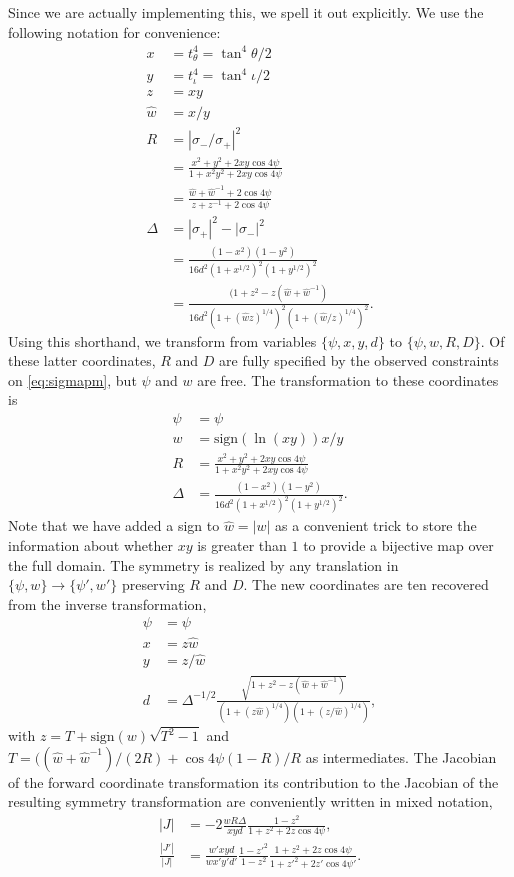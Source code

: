 \documentclass[aps,showpacs,twocolumn,prd,superscriptaddress,nofootinbib]{revtex4}
\newcommand\C{{\cos{4\psi}}}
\begin{document}
Since we are actually implementing this, we spell it out explicitly.  We use the following notation for convenience:
\begin{align}
  x&=t^4_{\theta}=\tan^4{\theta/2}\\
  y&=t^4_{\iota}=\tan^4{\iota/2}\\
  z&=xy\\
  \hat w&=x/y\\
  R&=|\sigma_-/\sigma_+|^2\\
  &=\frac{x^2+y^2+2xy\C}{1+x^2y^2+2xy\C}\\
  &=\frac{\hat w+\hat w^{-1}+2\C}{z+z^{-1}+2\C}\\
  \Delta&=|\sigma_+|^2-|\sigma_-|^2\\
  &=\frac{(1-x^2)(1-y^2)}{16d^2(1+x^{1/2})^2(1+y^{1/2})^2}\\
  &=\frac{(1+z^2-z(\hat w+{\hat w}^{-1})}{16d^2(1+({\hat w}z)^{1/4})^2(1+({\hat w}/z)^{1/4})^2}.
\end{align}
Using this shorthand, we transform from variables $\{\psi,x,y,d\}$ to $\{\psi,w,R,D\}$.
Of these latter coordinates, $R$ and $D$ are fully specified by the observed constraints on \eqref{eq:sigmapm},
but $\psi$ and $w$ are free. The transformation to these coordinates is
\begin{align}
  \psi&=\psi\\
  w&=\mathrm{sign}(\ln(xy))x/y\\
  R&=\frac{x^2+y^2+2xy\C}{1+x^2y^2+2xy\C}\\
  \Delta&=\frac{(1-x^2)(1-y^2)}{16d^2(1+x^{1/2})^2(1+y^{1/2})^2}.
\end{align}
Note that we have added a sign to ${\hat w}=|w|$ as a convenient trick to
store the information about whether $xy$ is greater than $1$ to provide a bijective map over the full domain. 
The symmetry is realized by any translation in $\{\psi,w\}\rightarrow\{\psi',w'\}$ preserving $R$ and $D$.
The new coordinates are ten recovered from the inverse transformation, 
\begin{align}
  \psi&=\psi\\
  x&=z\hat w\\
  y&=z/{\hat w}\\
  d&=\Delta^{-1/2}\frac {\sqrt{1+z^2-z(\hat w+{\hat w}^{-1})}}{(1+(z \hat w)^{1/4})(1+(z/{\hat w})^{1/4})},
\end{align}
with $z=T+\mathrm{sign}(w)\sqrt{T^2-1}$ and $T=(({\hat w}+{\hat w}^{-1})/(2R)+\C(1-R)/R$ as intermediates.
The Jacobian of the forward coordinate transformation its contribution to the Jacobian of the resulting
symmetry transformation are conveniently written in mixed notation,
\begin{align}
  |J|&=-2\frac{wR\Delta}{xyd}\frac{1-z^2}{1+z^2+2z\C},\\
  \frac{|J'|}{|J|}&=\frac{w'xyd}{wx'y'd'}\frac{1-z'^2}{1-z^2}\frac{1+z^2+2z\C}{1+z'^2+2z'\cos{4\psi'}}.
\end{align}
\end{document}
